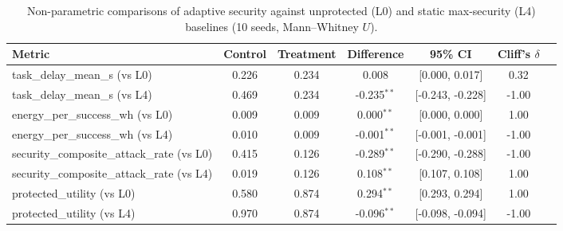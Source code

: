 \begin{table}
\centering
\small
\caption{Non-parametric comparisons of adaptive security against unprotected (L0) and static max-security (L4) baselines (10 seeds, Mann--Whitney $U$).}
\label{tab:p4-tests}
\begin{tabular}{lcccccc}
\toprule
Metric & Control & Treatment & Difference & 95\% CI & Cliff's $\delta$ \\
\midrule
task\_delay\_mean\_s (vs L0) & 0.226 & 0.234 & 0.008 & [0.000, 0.017] & 0.32 \\
task\_delay\_mean\_s (vs L4) & 0.469 & 0.234 & -0.235$^{**}$ & [-0.243, -0.228] & -1.00 \\
energy\_per\_success\_wh (vs L0) & 0.009 & 0.009 & 0.000$^{**}$ & [0.000, 0.000] & 1.00 \\
energy\_per\_success\_wh (vs L4) & 0.010 & 0.009 & -0.001$^{**}$ & [-0.001, -0.001] & -1.00 \\
security\_composite\_attack\_rate (vs L0) & 0.415 & 0.126 & -0.289$^{**}$ & [-0.290, -0.288] & -1.00 \\
security\_composite\_attack\_rate (vs L4) & 0.019 & 0.126 & 0.108$^{**}$ & [0.107, 0.108] & 1.00 \\
protected\_utility (vs L0) & 0.580 & 0.874 & 0.294$^{**}$ & [0.293, 0.294] & 1.00 \\
protected\_utility (vs L4) & 0.970 & 0.874 & -0.096$^{**}$ & [-0.098, -0.094] & -1.00 \\
\bottomrule
\end{tabular}
\par{}
\end{table}
